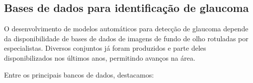 \documentclass[12pt]{article}
\begin{document}

\subsection{Bases de dados para identificação de glaucoma}
\label{sec:review:datasets}

O desenvolvimento de modelos automáticos para detecção de glaucoma depende da disponibilidade de bases de dados de imagens de fundo de olho rotuladas por especialistas. Diversos conjuntos já foram produzidos e parte deles disponibilizados nos últimos anos, permitindo avanços na área.

Entre os principais bancos de dados, destacamos:
\end{document}
